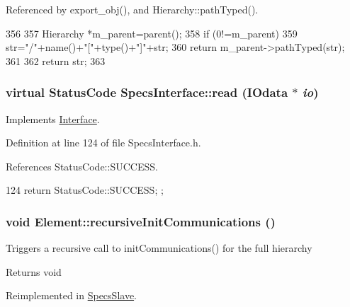 Referenced by export\_\-obj(), and Hierarchy::pathTyped().


\begin{DoxyCode}
356                                            {
357   Hierarchy *m_parent=parent();
358   if (0!=m_parent){
359     str="/"+name()+"["+type()+"]"+str;
360     return m_parent->pathTyped(str);
361   }
362   return str;
363 }
\end{DoxyCode}
\hypertarget{classSpecsInterface_a6f1c8ca420f08c8fca9347ca743087c5}{
\subsubsection[{read}]{\setlength{\rightskip}{0pt plus 5cm}virtual {\bf StatusCode} SpecsInterface::read ({\bf IOdata} $\ast$ {\em io})}}
\label{classSpecsInterface_a6f1c8ca420f08c8fca9347ca743087c5}


Implements \hyperlink{classInterface_a99136b67c8e6cbcaa0477c36940ac2ef}{Interface}.

Definition at line 124 of file SpecsInterface.h.

References StatusCode::SUCCESS.


\begin{DoxyCode}
124 { return StatusCode::SUCCESS; };
\end{DoxyCode}
\hypertarget{classElement_a82119ed37dff76508a2746a853ec35ba}{
\subsubsection[{recursiveInitCommunications}]{\setlength{\rightskip}{0pt plus 5cm}void Element::recursiveInitCommunications ()}}
\label{classElement_a82119ed37dff76508a2746a853ec35ba}
Triggers a recursive call to initCommunications() for the full hierarchy

\begin{DoxyReturn}{Returns}
void 
\end{DoxyReturn}


Reimplemented in \hyperlink{classSpecsSlave_a347b94c2ba660ccde6927fe72590a1bc}{SpecsSlave}.

